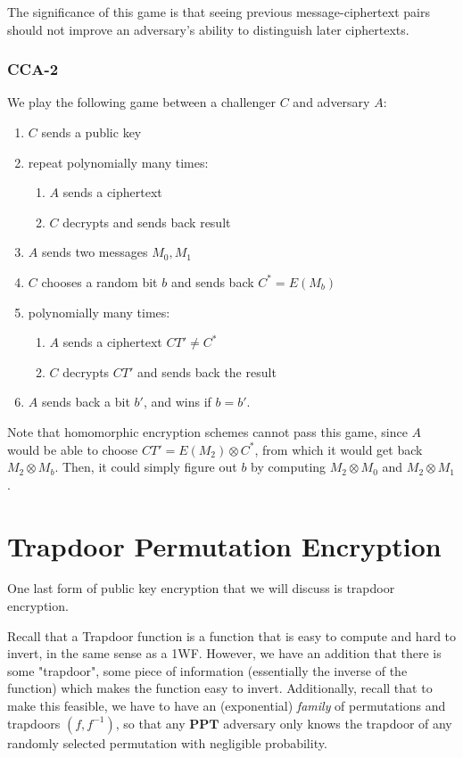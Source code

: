 \documentclass[11pt]{article}
\newcommand{\PPT}{\mathbf{PPT}}
\begin{document}
The significance of this game is that seeing previous message-ciphertext pairs should not improve an adversary's ability to distinguish later ciphertexts.

\subsubsection{CCA-2}
We play the following game between a challenger \(C\) and adversary \(A\):
\begin{enumerate}
\item \(C\) sends a public key
\item repeat polynomially many times:
\begin{enumerate}
\item \(A\) sends a ciphertext
\item \(C\) decrypts and sends back result
\end{enumerate}
\item \(A\) sends two messages \(M_0, M_1\)
\item \(C\) chooses a random bit \(b\) and sends back \(C^*=E(M_b)\)
\item polynomially many times:
\begin{enumerate}
\item \(A\) sends a ciphertext \(CT'\ne C^*\)
\item \(C\) decrypts \(CT'\) and sends back the result
\end{enumerate}
\item \(A\) sends back a bit \(b'\), and wins if \(b=b'\).
\end{enumerate}

Note that homomorphic encryption schemes cannot pass this game,
since \(A\) would be able to choose \(CT' = E(M_2)\otimes C^*\),
from which it would get back \(M_2\otimes M_b\).
Then, it could simply figure out \(b\) by computing \(M_2\otimes M_0\) and \(M_2\otimes M_1\).

\newpage
\section{Trapdoor Permutation Encryption}
One last form of public key encryption that we will discuss is trapdoor encryption.\smallskip

Recall that a Trapdoor function is a function that is easy to compute and hard to invert, in the same sense as a 1WF.
However, we have an addition that there is some "trapdoor", some piece of information (essentially the inverse of the function)
which makes the function easy to invert.
Additionally, recall that to make this feasible, we have to have an (exponential) \emph{family} of permutations and trapdoors \((f,f^{-1})\),
so that any \(\PPT\) adversary only knows the trapdoor of any randomly selected permutation with negligible probability.\medskip
\end{document}
